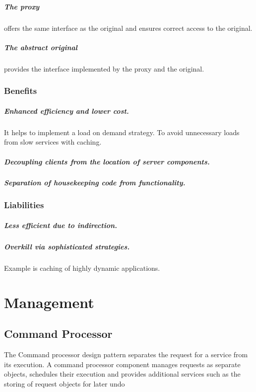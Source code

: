 \documentclass[a4paper,11pt,twocolumn]{report}
\begin{document}
    \paragraph{The proxy} offers the same interface as the original and ensures
    correct access to the original. 
    \paragraph{The abstract original} provides the interface implemented by the
    proxy and the original.
    \subsection{Benefits}
    \paragraph{Enhanced efficiency and lower cost.} It helps to implement a
    load on demand strategy. To avoid unnecessary loads from slow services with
    caching.
    \paragraph{Decoupling clients from the location of server components.}
    \paragraph{Separation of housekeeping code from functionality.}
    \subsection{Liabilities}
    \paragraph{Less efficient due to indirection.}
    \paragraph{Overkill via sophisticated strategies.} Example is caching of
    highly dynamic applications.
    
    
    \chapter{Management}

    \section{Command Processor}
    The Command processor design pattern separates the request for a service
    from its execution. A command processor component manages requests as
    separate objects, schedules their execution and provides additional
    services such as the storing of request objects for later undo
\end{document}
